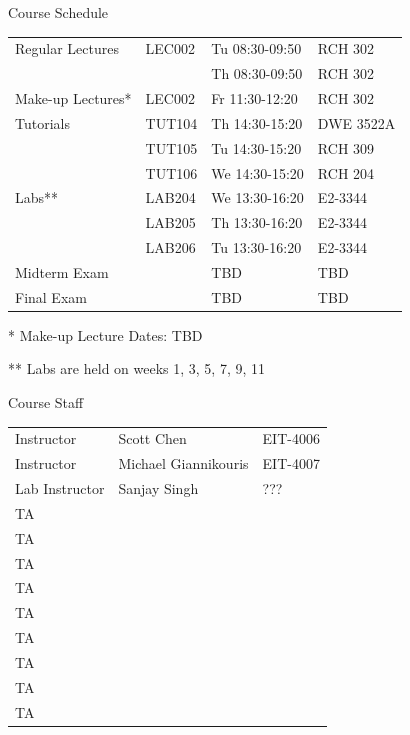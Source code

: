 \documentclass{beamer}
\begin{document}
	\begin{frame}{Course Schedule}
		\begin{center}
			\begin{tabular}{l l l l}
				Regular Lectures & LEC002 & Tu 08:30-09:50 & RCH 302 	\\
								 & 		  & Th 08:30-09:50 & RCH 302 	\\
				\hline
				Make-up Lectures*& LEC002 & Fr 11:30-12:20 & RCH 302 	\\
				\hline			
				Tutorials 		 & TUT104 & Th 14:30-15:20 & DWE 3522A 	\\
						  		 & TUT105 & Tu 14:30-15:20 & RCH 309   	\\
						  		 & TUT106 & We 14:30-15:20 & RCH 204   	\\
				\hline			
				Labs** 	  		 & LAB204 & We 13:30-16:20 & E2-3344	\\
								 & LAB205 & Th 13:30-16:20 & E2-3344	\\
								 & LAB206 & Tu 13:30-16:20 & E2-3344	\\
				\hline			
				Midterm Exam 	 &  	  & TBD 		   & TBD 		\\
				\hline			
				Final Exam		 &  	  & TBD 		   & TBD 		\\
				\hline
			\end{tabular}
		\end{center}		
		*    Make-up Lecture Dates: TBD
		
		**   Labs are held on weeks 1, 3, 5, 7, 9, 11
	\end{frame}
	
	\begin{frame}{Course Staff}
		\begin{center}
			\begin{tabular}{l l l}
				Instructor & Scott Chen 			& EIT-4006 \\
				Instructor & Michael Giannikouris 	& EIT-4007 \\
				\hline
				Lab Instructor & Sanjay Singh & ??? \\
				\hline			
				TA \\
				TA \\
				TA \\
				TA \\
				TA \\
				TA \\
				TA \\
				TA \\
				TA \\
				\hline
			\end{tabular}
		\end{center}
	\end{frame}
	
\end{document}
